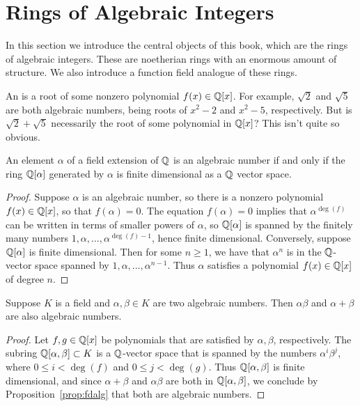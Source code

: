\section{Rings of Algebraic Integers}

In this section we introduce the central objects of this book, which
are the rings of algebraic integers.  These are noetherian rings with
an enormous amount of structure.  We also introduce a function field
analogue of these rings.


An  is a root of some nonzero polynomial $f(x) \in \mathbb{Q}[x]$.
For example, $\sqrt{2}$ and $\sqrt{5}$ are both algebraic numbers, being
roots of $x^2-2$ and $x^2-5$, respectively.
But is $\sqrt{2} + \sqrt{5}$ necessarily the root of some polynomial in $\mathbb{Q}[x]$?
This isn't quite so obvious.

\begin{proposition}\label{prop:fdalg}
	An element $\alpha$ of a field extension of $\mathbb{Q}$ is an
	algebraic number if and only if the ring $\mathbb{Q}[\alpha]$
	generated by $\alpha$ is finite dimensional as a $\mathbb{Q}$ vector
	space.
\end{proposition}
\begin{proof}
	Suppose $\alpha$ is an algebraic number, so there is a nonzero
	polynomial $f(x)\in\mathbb{Q}[x]$, so that $f(\alpha)=0$. The equation
	$f(\alpha)=0$ implies that $\alpha^{\deg(f)}$ can be written in
	terms of smaller powers of $\alpha$, so $\mathbb{Q}[\alpha]$ is spanned
	by the finitely many numbers $1,\alpha,\ldots,\alpha^{\deg(f)-1}$,
	hence finite dimensional. Conversely, suppose $\mathbb{Q}[\alpha]$ is finite
	dimensional.  Then for some $n\geq 1$, we have that $\alpha^n$ is in
	the $\mathbb{Q}$-vector space spanned by $1,\alpha,\ldots, \alpha^{n-1}$.
	Thus $\alpha$ satisfies a polynomial $f(x) \in \mathbb{Q}[x]$ of degree $n$.
\end{proof}

\begin{proposition}\label{prop:algnumfield}
	Suppose $K$ is a field and $\alpha, \beta\in K$ are two
	algebraic numbers. Then $\alpha\beta$ and $\alpha+\beta$
	are also algebraic numbers.
\end{proposition}
\begin{proof}
	Let $f, g\in\mathbb{Q}[x]$ be polynomials that are satisfied by $\alpha,\beta$, respectively. The subring $\mathbb{Q}[\alpha,\beta]\subset K$ is a
	$\mathbb{Q}$-vector space that is spanned by the numbers $\alpha^i\beta^j$,
	where $0\leq i<\deg(f)$ and $0\leq j<\deg(g)$. Thus
	$\mathbb{Q}[\alpha,\beta]$ is finite dimensional, and since $\alpha+\beta$
	and $\alpha\beta$ are both in $\mathbb{Q}[\alpha,\beta]$, we conclude by Proposition~\ref{prop:fdalg} that both are algebraic numbers.
\end{proof}

